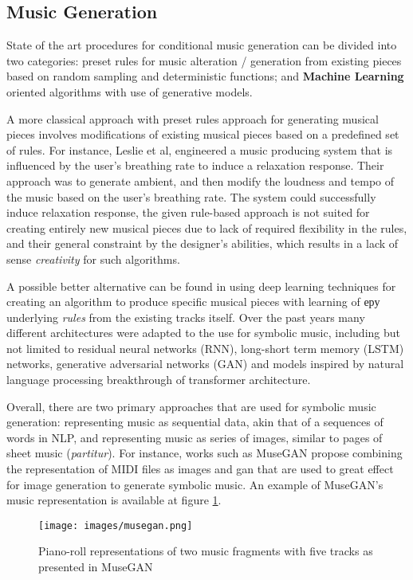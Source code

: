 \documentclass[14pt]{extreport}
\begin{document}
\subsection{Music Generation}

State of the art procedures for conditional music generation can be divided into two categories: preset rules for music alteration / generation from existing pieces based on random sampling and deterministic functions; and \textbf{Machine Learning} oriented algorithms with use of generative models. 

A more classical approach with preset rules approach for generating musical pieces involves  modifications of existing musical pieces based on a predefined set of rules. For instance, Leslie et al\cite{leslie}, engineered a music producing system that is influenced by the user's breathing rate to induce a relaxation response. Their approach was to generate \gls{ambient}, and then modify the loudness and tempo of the music based on the user's breathing rate. The system could successfully induce relaxation response, the given rule-based approach is not suited for creating entirely new musical pieces due to lack of required flexibility in the rules, and their general constraint by the designer's abilities, which results in a lack of sense \emph{creativity} for such algorithms.

A possible better alternative can be found in using deep learning techniques for creating an algorithm to produce specific musical pieces with learning of еру underlying \emph{rules} from the existing tracks itself. Over the past years many different architectures were adapted to the use for symbolic music, including but not limited to residual neural networks (RNN), long-short term memory (LSTM) networks, generative adversarial networks (GAN) and models inspired by natural language processing breakthrough of transformer architecture.

Overall, there are two primary approaches that are used for symbolic music generation: representing music as sequential data, akin that of a sequences of words in NLP, and representing music as series of images, similar to pages of sheet music (\emph{partitur}). For instance, works such as MuseGAN \cite{musegan}  propose combining the representation of MIDI files as images and \acrlong{gan} that are used to great effect for image generation to generate symbolic music. An example of MuseGAN's music representation is available at figure \ref{fig:musegan}.

\begin{figure}[h!]
\centering
\texttt{[image: images/musegan.png]}
\caption{Piano-roll representations of two music fragments with five tracks as presented in MuseGAN\cite{musegan}}
\label{fig:musegan}
\end{figure}
\end{document}
